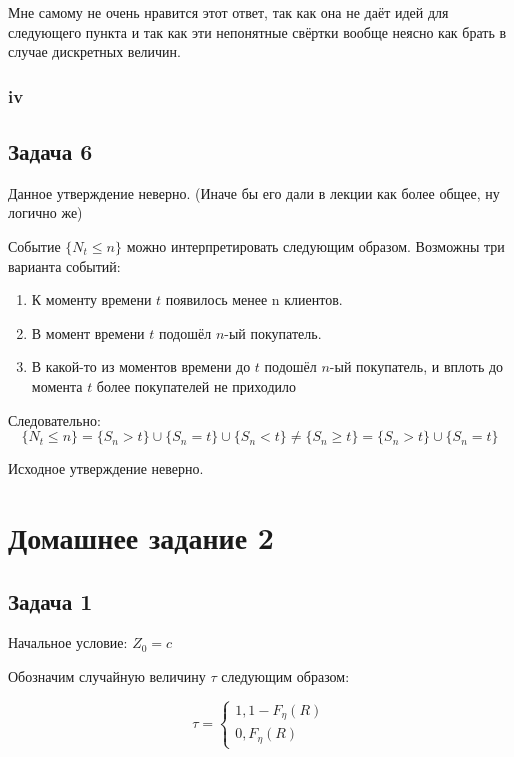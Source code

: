 \documentclass[a4paper,12pt]{article}
\begin{document}
Мне самому не очень нравится этот ответ, так как она не даёт идей для следующего пункта и так как эти непонятные свёртки вообще неясно как брать в случае дискретных величин. 


\subsubsection{iv}

\subsection{Задача 6}

Данное утверждение неверно. (Иначе бы его дали в лекции как более общее, ну логично же)

Событие $ \{N_t \le n\}$ можно интерпретировать следующим образом. Возможны три варианта событий:

\begin{enumerate}[\Sun]
	\item	К моменту времени $ t $ появилось менее n клиентов. 
	
	\item В момент времени $ t $ подошёл $ n $-ый покупатель.
	
	\item В какой-то из моментов времени до $ t $ подошёл $ n $-ый покупатель, и вплоть до момента $ t $ более покупателей не приходило
\end{enumerate}

Следовательно:
\[  \{N_t \le n\} = \{S_n > t\} \cup \{S_n = t\} \cup \{S_n < t\} \neq \{S_n \ge t \} =  \{S_n > t\} \cup \{S_n = t\}  \]

Исходное утверждение неверно.


\section{Домашнее задание 2}

\subsection{Задача 1}

Начальное условие: $ Z_0 = c $

Обозначим случайную величину $ \tau $ следующим образом: 

\[\tau = \begin{cases}
1,  1-F_\eta(R)\\
0, F_\eta(R)
\end{cases}  \]
\end{document}
